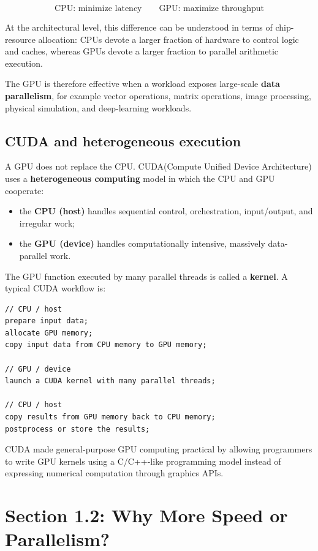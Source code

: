 \documentclass[11pt,a4paper]{article}
\begin{document}
\[
\boxed{\text{CPU: minimize latency} \qquad \text{GPU: maximize throughput}}
\]

At the architectural level, this difference can be understood in terms of chip-resource allocation: CPUs devote a larger fraction of hardware to control logic and caches, whereas GPUs devote a larger fraction to parallel arithmetic execution.

The GPU is therefore effective when a workload exposes large-scale \textbf{data parallelism}, for example vector operations, matrix operations, image processing, physical simulation, and deep-learning workloads.

\subsection{CUDA and heterogeneous execution}

A GPU does not replace the CPU. CUDA(Compute Unified Device Architecture) uses a \textbf{heterogeneous computing} model in which the CPU and GPU cooperate:

\begin{itemize}[leftmargin=2em,itemsep=3pt]
    \item the \textbf{CPU (host)} handles sequential control, orchestration, input/output, and irregular work;
    \item the \textbf{GPU (device)} handles computationally intensive, massively data-parallel work.
\end{itemize}

The GPU function executed by many parallel threads is called a \textbf{kernel}. A typical CUDA workflow is:

\begin{lstlisting}
// CPU / host
prepare input data;
allocate GPU memory;
copy input data from CPU memory to GPU memory;

// GPU / device
launch a CUDA kernel with many parallel threads;

// CPU / host
copy results from GPU memory back to CPU memory;
postprocess or store the results;
\end{lstlisting}

CUDA made general-purpose GPU computing practical by allowing programmers to write GPU kernels using a C/C++-like programming model instead of expressing numerical computation through graphics APIs.

\section{Section 1.2: Why More Speed or Parallelism?}
\end{document}

